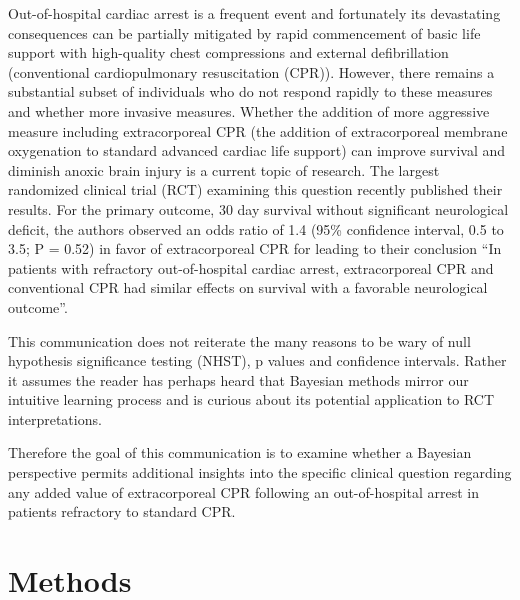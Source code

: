 \documentclass[
  super,
  preprint,
  3p]{elsarticle}
\begin{document}
Out-of-hospital cardiac arrest is a frequent event and fortunately its
devastating consequences can be partially mitigated by rapid
commencement of basic life support with high-quality chest compressions
and external defibrillation (conventional cardiopulmonary resuscitation
(CPR)). However, there remains a substantial subset of individuals who
do not respond rapidly to these measures and whether more invasive
measures. Whether the addition of more aggressive measure including
extracorporeal CPR (the addition of extracorporeal membrane oxygenation
to standard advanced cardiac life support) can improve survival and
diminish anoxic brain injury is a current topic of research. The largest
randomized clinical trial (RCT) examining this question recently
published their results\citep{CPR2023a}. For the primary outcome, 30 day
survival without significant neurological deficit, the authors observed
an odds ratio of 1.4 (95\% confidence interval, 0.5 to 3.5; P = 0.52) in
favor of extracorporeal CPR for leading to their conclusion ``In
patients with refractory out-of-hospital cardiac arrest, extracorporeal
CPR and conventional CPR had similar effects on survival with a
favorable neurological outcome''.\citep{CPR2023a}

This communication does not reiterate the many reasons to be wary of
null hypothesis significance testing (NHST), p values and confidence
intervals\citep{RN5420}. Rather it assumes the reader has perhaps heard
that Bayesian methods mirror our intuitive learning process and is
curious about its potential application to RCT interpretations.

Therefore the goal of this communication is to examine whether a
Bayesian perspective permits additional insights into the specific
clinical question regarding any added value of extracorporeal CPR
following an out-of-hospital arrest in patients refractory to standard
CPR.

\hypertarget{methods}{%
\section{Methods}\label{methods}}
\end{document}
